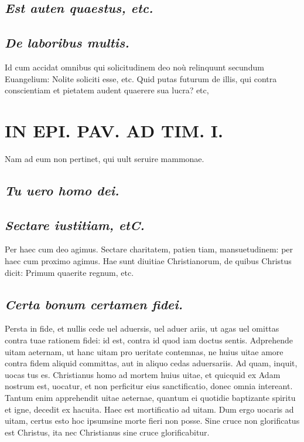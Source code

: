 \documentclass{article}
\begin{document}
\begin{pages}
\subsection*{\textit{Est auten quaestus, etc. }}
{}
\subsection*{\textit{De laboribus multis. }}\pstart Id cum accidat omnibus qui solicitudinem deo noù relinquunt secundum Euangelium: Nolite soliciti esse, etc. Quid putas futurum de illis, qui contra conscientiam et pietatem audent quaerere sua lucra? etc,  \pend
\section*{IN EPI. PAV. AD TIM. I. }
\marginpar{[ p.99 ]}\pstart Nam ad eum non pertinet, qui uult seruire mammonae.  \pend
{}
{}
\subsection*{\textit{Tu uero homo dei. }}
{}
\subsection*{\textit{Sectare iustitiam, etC. }}\pstart Per haec cum deo agimus. Sectare charitatem, patien tiam, mansuetudinem: per haec cum proximo agimus. Hae sunt diuitiae Christianorum, de quibus Christus dicit: Primum quaerite regnum, etc.  \pend
{}
{}
\subsection*{\textit{Certa bonum certamen fidei. }}\pstart Persta in fide, et nullis cede uel aduersis, uel aduer ariis, ut agas uel omittas contra tuae rationem fidei: id est, contra id quod iam doctus sentis. Adprehende uitam aeternam, ut hanc uitam pro ueritate contemnas, ne huius uitae amore contra fidem aliquid committas, aut in aliquo cedas aduersariis. Ad quam, inquit, uocas tus es. Christianus homo ad mortem huius uitae, et quicquid ex Adam nostrum est, uocatur, et non perficitur eius sanctificatio, donec omnia intereant. Tantum enim apprehendit uitae aeternae, quantum ei quotidie baptizante spiritu et igne, decedit ex hacuita. Haec est mortificatio ad uitam. Dum ergo uocaris ad uitam, certus esto hoc ipsumsine morte fieri non posse. Sine cruce non glorificatus est Christus, ita nec Christianus sine cruce glorificabitur.  \pend
{}
{}

\end{pages}
\end{document}
